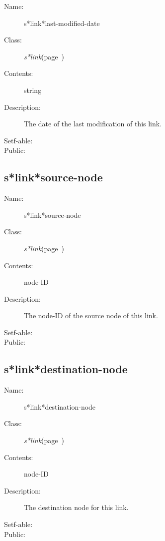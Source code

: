 \begin{description}

\item [Name:]  s*link*last-modified-date

\item [Class:] {\sl s*link}\hfill(page~\pageref{s*link})

\item [Contents:] string

\item [Description:] 
The date of the last modification of this link.

\item [Setf-able:]


\item [Public:]



\end{description}
\horizontalline

\subsection{s*link*source-node}
\label{s*link*source-node}

\begin{description}
\item [Name:]  s*link*source-node

\item [Class:] {\sl s*link}\hfill(page~\pageref{s*link})

\item [Contents:] node-ID

\item [Description:]
The node-ID of the source node of this link.

\item [Setf-able:]


\item [Public:]



\end{description}
\horizontalline

\subsection{s*link*destination-node}
\label{s*link*destination-node}

\begin{description}

\item [Name:]  s*link*destination-node

\item [Class:] {\sl s*link}\hfill(page~\pageref{s*link})

\item [Contents:] node-ID

\item [Description:] 
The destination node for this link.

\item [Setf-able:]

\item [Public:]



\end{description}
\horizontalline

